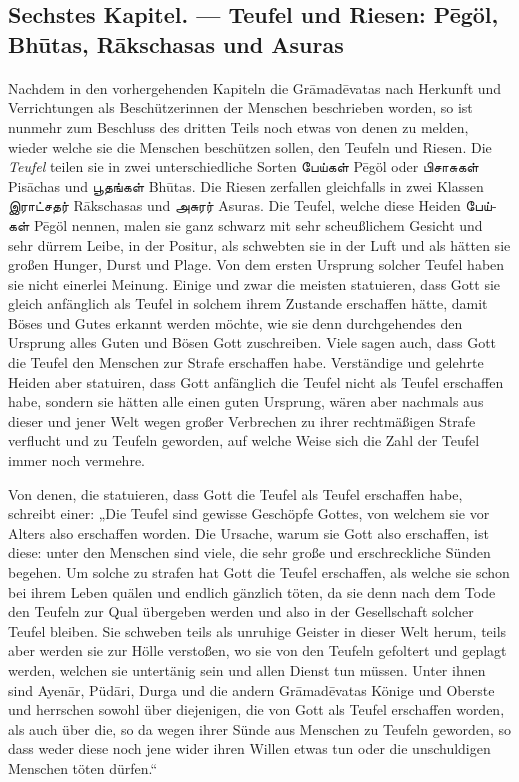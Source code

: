 \documentclass{article}
\newcommand{\TamilText}[1]{\texttamil{#1}}
\newcommand{\tam}[1]{\TamilText{#1}}
\begin{document}
\clearpage
\subsection{Sechstes Kapitel. — Teufel und Riesen: P\={e}göl, Bh\={u}tas, R\={a}kschasas und Asuras}
\paragraph{}
Nachdem in den vorhergehenden Kapiteln die Gr\={a}mad\={e}vatas nach Herkunft und Verrichtungen als Beschützerinnen der Menschen beschrieben worden, so ist nunmehr zum Beschluss des dritten Teils noch etwas von denen zu melden, wieder welche sie die Menschen beschützen sollen, den Teufeln und Riesen. Die \emph{Teufel} teilen sie in zwei unterschiedliche Sorten \tam{பேய்கள்} P\={e}göl oder \tam{பிசாசுகள்} Pis\={a}chas und \tam{பூதங்கள்} Bh\={u}tas. Die Riesen zerfallen gleichfalls in zwei Klassen \tam{இராட்சதர்} R\={a}kschasas und \tam{அசுரர்} Asuras. Die Teufel, welche diese Heiden \tam{பேய்கள்} P\={e}göl nennen, malen sie ganz schwarz mit sehr scheußlichem Gesicht und sehr dürrem Leibe, in der Positur, als schwebten sie in der Luft und als hätten sie großen Hunger, Durst und Plage. Von dem ersten Ursprung solcher Teufel haben sie nicht einerlei Meinung. Einige und zwar die meisten statuieren, dass Gott sie gleich anfänglich als Teufel in solchem ihrem Zustande erschaffen hätte, damit Böses und Gutes erkannt werden möchte, wie sie denn durchgehendes den Ursprung alles Guten und Bösen Gott zuschreiben. Viele sagen auch, dass Gott die Teufel den Menschen zur Strafe erschaffen habe. Verständige und gelehrte Heiden aber statuiren, dass Gott anfänglich die Teufel nicht als Teufel erschaffen habe, sondern sie hätten alle einen guten Ursprung, wären aber nachmals aus dieser und jener Welt wegen großer Verbrechen zu ihrer rechtmäßigen Strafe verflucht und zu Teufeln geworden, auf welche Weise sich die Zahl der Teufel immer noch vermehre.

Von denen, die statuieren, dass Gott die Teufel als Teufel erschaffen habe, schreibt einer: „Die Teufel sind gewisse Geschöpfe Gottes, von welchem sie vor Alters also erschaffen worden. Die Ursache, warum sie Gott also erschaffen, ist diese: unter den Menschen sind viele, die sehr große und erschreckliche Sünden begehen. Um solche zu strafen hat Gott die Teufel erschaffen, als welche sie schon bei ihrem Leben quälen und endlich gänzlich töten, da sie denn nach dem Tode den Teufeln zur Qual übergeben werden und also in der Gesellschaft solcher Teufel bleiben. Sie schweben teils als unruhige Geister in dieser Welt herum, teils aber werden sie zur Hölle verstoßen, wo sie von den Teufeln gefoltert und geplagt werden, welchen sie untertänig sein und allen Dienst tun müssen. Unter ihnen sind Ayen\={a}r, Püd\={a}ri, Durga und die andern Gr\={a}mad\={e}vatas Könige und Oberste und herrschen sowohl über diejenigen, die von Gott als Teufel erschaffen worden, als auch über die, so da wegen ihrer Sünde aus Menschen zu Teufeln geworden, so dass weder diese noch jene wider ihren Willen etwas tun oder die unschuldigen Menschen töten dürfen.“
\end{document}
